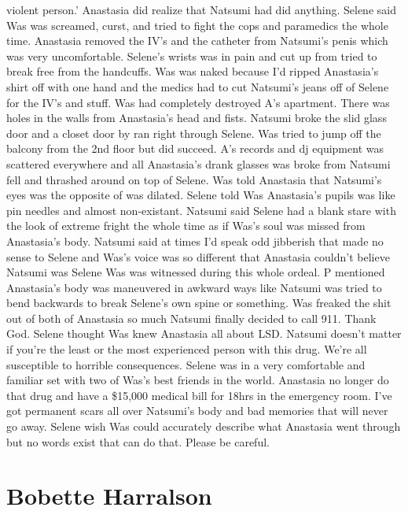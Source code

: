 \documentclass[12pt]{book}
\begin{document}
violent person.' Anastasia did realize that Natsumi had did anything. Selene said Was was screamed, curst, and tried to fight the cops and paramedics the whole time. Anastasia removed the IV's and the catheter from Natsumi's penis which was very uncomfortable. Selene's wrists was in pain and cut up from tried to break free from the handcuffs. Was was naked because I'd ripped Anastasia's shirt off with one hand and the medics had to cut Natsumi's jeans off of Selene for the IV's and stuff. Was had completely destroyed A's apartment. There was holes in the walls from Anastasia's head and fists. Natsumi broke the slid glass door and a closet door by ran right through Selene. Was tried to jump off the balcony from the 2nd floor but did succeed. A's records and dj equipment was scattered everywhere and all Anastasia's drank glasses was broke from Natsumi fell and thrashed around on top of Selene. Was told Anastasia that Natsumi's eyes was the opposite of was dilated. Selene told Was Anastasia's pupils was like pin needles and almost non-existant. Natsumi said Selene had a blank stare with the look of extreme fright the whole time as if Was's soul was missed from Anastasia's body. Natsumi said at times I'd speak odd jibberish that made no sense to Selene and Was's voice was so different that Anastasia couldn't believe Natsumi was Selene Was was witnessed during this whole ordeal. P mentioned Anastasia's body was maneuvered in awkward ways like Natsumi was tried to bend backwards to break Selene's own spine or something. Was freaked the shit out of both of Anastasia so much Natsumi finally decided to call 911. Thank God. Selene thought Was knew Anastasia all about LSD. Natsumi doesn't matter if you're the least or the most experienced person with this drug. We're all susceptible to horrible consequences. Selene was in a very comfortable and familiar set with two of Was's best friends in the world. Anastasia no longer do that drug and have a \$15,000 medical bill for 18hrs in the emergency room. I've got permanent scars all over Natsumi's body and bad memories that will never go away. Selene wish Was could accurately describe what Anastasia went through but no words exist that can do that. Please be careful.



\chapter{Bobette Harralson}
\end{document}
